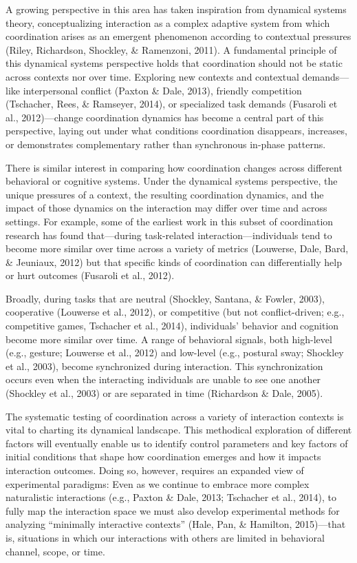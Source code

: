 \documentclass[10pt, letterpaper]{article}
\begin{document}
A growing perspective in this area has taken inspiration from dynamical
systems theory, conceptualizing interaction as a complex adaptive system
from which coordination arises as an emergent phenomenon according to
contextual pressures (Riley, Richardson, Shockley, \& Ramenzoni, 2011).
A fundamental principle of this dynamical systems perspective holds that
coordination should not be static across contexts nor over time.
Exploring new contexts and contextual demands---like interpersonal
conflict (Paxton \& Dale, 2013), friendly competition (Tschacher, Rees,
\& Ramseyer, 2014), or specialized task demands (Fusaroli et al.,
2012)---change coordination dynamics has become a central part of this
perspective, laying out under what conditions coordination disappears,
increases, or demonstrates complementary rather than synchronous
in-phase patterns.

There is similar interest in comparing how coordination changes across
different behavioral or cognitive systems. Under the dynamical systems
perspective, the unique pressures of a context, the resulting
coordination dynamics, and the impact of those dynamics on the
interaction may differ over time and across settings. For example, some
of the earliest work in this subset of coordination research has found
that---during task-related interaction---individuals tend to become more
similar over time across a variety of metrics (Louwerse, Dale, Bard, \&
Jeuniaux, 2012) but that specific kinds of coordination can
differentially help or hurt outcomes (Fusaroli et al., 2012).

Broadly, during tasks that are neutral (Shockley, Santana, \& Fowler,
2003), cooperative (Louwerse et al., 2012), or competitive (but not
conflict-driven; e.g., competitive games, Tschacher et al., 2014),
individuals' behavior and cognition become more similar over time. A
range of behavioral signals, both high-level (e.g., gesture; Louwerse et
al., 2012) and low-level (e.g., postural sway; Shockley et al., 2003),
become synchronized during interaction. This synchronization occurs even
when the interacting individuals are unable to see one another (Shockley
et al., 2003) or are separated in time (Richardson \& Dale, 2005).

The systematic testing of coordination across a variety of interaction
contexts is vital to charting its dynamical landscape. This methodical
exploration of different factors will eventually enable us to identify
control parameters and key factors of initial conditions that shape how
coordination emerges and how it impacts interaction outcomes. Doing so,
however, requires an expanded view of experimental paradigms: Even as we
continue to embrace more complex naturalistic interactions (e.g., Paxton
\& Dale, 2013; Tschacher et al., 2014), to fully map the interaction
space we must also develop experimental methods for analyzing
``minimally interactive contexts'' (Hale, Pan, \& Hamilton, 2015)---that
is, situations in which our interactions with others are limited in
behavioral channel, scope, or time.
\end{document}
